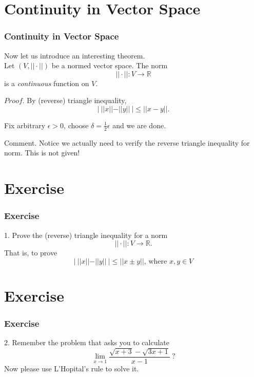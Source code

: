 \documentclass[12pt, t]{beamer}
\renewcommand{\emph}[1]{{\color{Turquoise3}\textsl{#1}}}
\begin{document}
\section{Continuity in Vector Space}
\begin{frame}
    \frametitle{Continuity in Vector Space}
    Now let us introduce an interesting theorem. \\
    \vspace{1em}
    \hspace{1em}
    Let $(V,||\cdot||)$ be a normed vector space. The norm
    \begin{equation*}
        ||\cdot||:V\rightarrow \mathbb{R}
    \end{equation*}
    is a \emph{continuous} function on $V$.

    \vspace{1em}
    $Proof.$ \hspace{1em}
    By (reverse) triangle inequality,
    \begin{equation*}
        |\ ||x||-||y||\ |\leq ||x-y||.
    \end{equation*}

    Fix arbitrary $\epsilon>0$, choose $\delta=\frac{1}{2}\epsilon$ and we are done.

    \vspace{1em}
    Comment. Notice we actually need to verify the reverse triangle inequality for norm. This is not given!
\end{frame}

\section{Exercise}
\begin{frame}
    \frametitle{Exercise}
    1. Prove the (reverse) triangle inequality for a norm
    \begin{equation*}
        ||\cdot||:V\rightarrow \mathbb{R}.
    \end{equation*}
    That is, to prove
    \begin{equation*}
        |\ ||x||-||y||\ |\leq ||x\pm y||\text{, where }x,y\in V
    \end{equation*}
\end{frame}

\section{Exercise}
\begin{frame}
    \frametitle{Exercise}
    2. Remember the problem that asks you to calculate
    \begin{equation*}
        \underset{x\rightarrow 1}{\lim}\frac{\sqrt{x+3}-\sqrt{3x+1}}{x-1}\ ?
    \end{equation*}
    Now please use L'Hopital's rule to solve it.
\end{frame}
\end{document}
